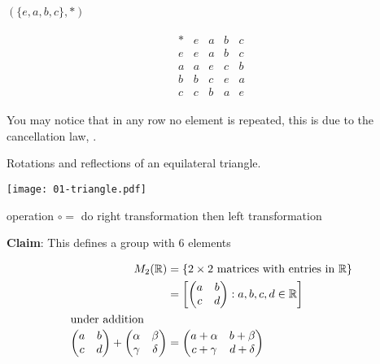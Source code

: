 \begin{example}
\protect\hypertarget{exm:nine}{}\label{exm:nine}\((\{e, a, b, c\}, *)\)

\begin{align*}
    \begin{array}{c|cccc}
        * & e & a & b & c \\
        \hline
        e & e & a & b & c \\
        a & a & e & c & b \\
        b & b & c & e & a \\
        c & c & b & a & e
    \end{array} 
\end{align*}

You may notice that in any row no element is repeated, this is due to the cancellation law, .
\end{example}

\begin{example}
\protect\hypertarget{exm:triangle}{}\label{exm:triangle}
Rotations and reflections of an equilateral triangle.

{\centering
\texttt{[image: 01-triangle.pdf]}}

operation \(\circ =\) do right transformation then left transformation

\textbf{Claim}: This defines a group with 6 elements
\end{example}

\begin{example}
\begin{align*}
    M_2(\mathbb{R}) &= \{ 2 \times 2 \text{ matrices with entries in } \mathbb{R} \} \\
    &= \left[ \begin{pmatrix} a & b \\ c & d \end{pmatrix} : a, b, c, d \in \mathbb{R} \right] \\
    \intertext{under addition}
    \begin{pmatrix}
    a & b \\
    c & d
    \end{pmatrix} + 
    \begin{pmatrix}
    \alpha & \beta \\
    \gamma & \delta
    \end{pmatrix} &=
    \begin{pmatrix}
    a + \alpha & b + \beta \\
    c + \gamma & d + \delta
    \end{pmatrix}
\end{align*}
\end{example}

